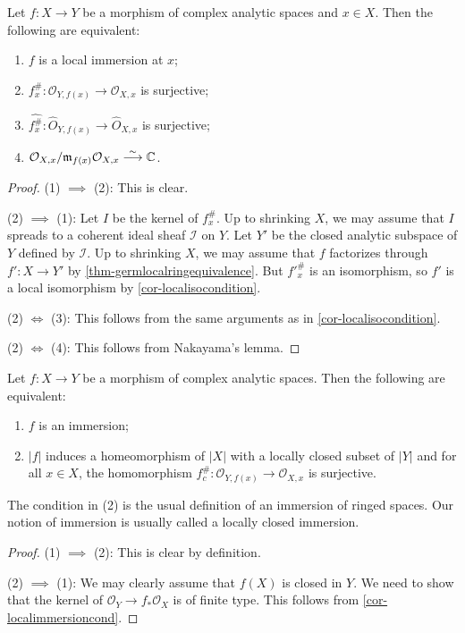 \begin{corollary}\label{cor-localimmersioncond}
    Let $f:X\rightarrow Y$ be a morphism of complex analytic spaces and $x\in X$. Then the following are equivalent:
    \begin{enumerate}
        \item $f$ is a local immersion at $x$;
        \item $f^{\#}_x:\mathcal{O}_{Y,f(x)}\rightarrow \mathcal{O}_{X,x}$ is surjective;
        \item $\widehat{f^{\#}_x}:\hat{O}_{Y,f(x)}\rightarrow \hat{O}_{X,x}$ is surjective;
        \item $\mathcal{O}_{X,x}/\mathfrak{m}_{f(x)}\mathcal{O}_{X,x}\stackrel{\sim}{\longrightarrow} \mathbb{C}$.
    \end{enumerate}
\end{corollary}
\begin{proof}
    (1) $\implies$ (2): This is clear.

    (2) $\implies$ (1): Let $I$ be the kernel of $f^{\#}_x$. Up to shrinking $X$, we may assume that $I$ spreads to a coherent ideal sheaf $\mathcal{I}$ on $Y$. Let $Y'$ be the closed analytic subspace of $Y$ defined by $\mathcal{I}$. Up to shrinking $X$, we may assume that $f$ factorizes through $f':X\rightarrow Y'$ by \cref{thm-germlocalringequivalence}. But $f'^{\#}_x$ is an isomorphism, so $f'$ is a local isomorphism by \cref{cor-localisocondition}.

    (2) $\Leftrightarrow$ (3): This follows from the same arguments as in \cref{cor-localisocondition}.

    (2) $\Leftrightarrow$ (4): This follows from Nakayama's lemma.
\end{proof}

\begin{corollary}\label{cor-immersiongeneralnotion}
    Let $f:X\rightarrow Y$ be a morphism of complex analytic spaces. Then the following are equivalent:
    \begin{enumerate}
        \item $f$ is an immersion;
        \item $|f|$ induces a homeomorphism of $|X|$ with a locally closed subset of $|Y|$ and for all $x\in X$, the homomorphism $f^{\#}_c:\mathcal{O}_{Y,f(x)}\rightarrow \mathcal{O}_{X,x}$ is surjective.
    \end{enumerate}
\end{corollary}
The condition in (2) is the usual definition of an immersion of ringed spaces. Our notion of immersion is usually called a locally closed immersion. 
\begin{proof}
    (1) $\implies$ (2): This is clear by definition.

    (2) $\implies$ (1): We may clearly assume that $f(X)$ is closed in $Y$. We need to show that the kernel of $\mathcal{O}_Y\rightarrow f_*\mathcal{O}_X$ is of finite type. This follows from \cref{cor-localimmersioncond}.
\end{proof}


